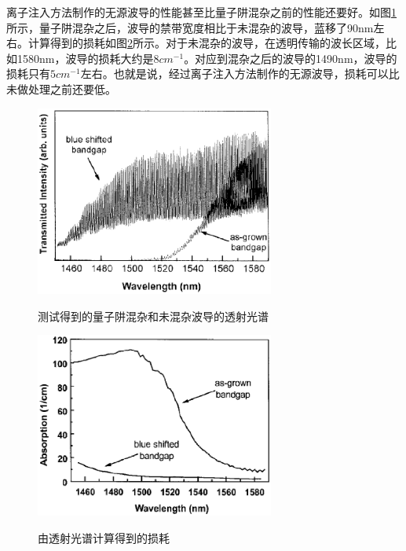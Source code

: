 \documentclass{ZJUthesis}
\begin{document}
离子注入方法制作的无源波导的性能甚至比量子阱混杂之前的性能还要好。如图\ref{fig_implantation_wg_test}所示，量子阱混杂之后，波导的禁带宽度相比于未混杂的波导，蓝移了90nm左右。计算得到的损耗如图\ref{fig_implantation_wg_loss}所示。对于未混杂的波导，在透明传输的波长区域，比如1580nm，波导的损耗大约是$8cm^{-1}$。对应到混杂之后的波导的1490nm，波导的损耗只有$5cm^{-1}$左右。也就是说，经过离子注入方法制作的无源波导，损耗可以比未做处理之前还要低。

\begin{figure}[!htb]
  \centering
  \includegraphics[width=0.7\textwidth]{./Pictures/implantation_wg_test.eps}\\
  \caption{测试得到的量子阱混杂和未混杂波导的透射光谱}
  \label{fig_implantation_wg_test}
\end{figure}

\begin{figure}[!htb]
  \centering
  \includegraphics[width=0.7\textwidth]{./Pictures/implantation_wg_loss.eps}\\
  \caption{由透射光谱计算得到的损耗}
  \label{fig_implantation_wg_loss}
\end{figure}
\end{document}
